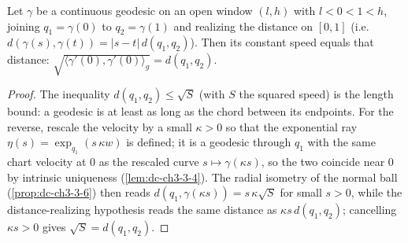 \begin{lemma}
  \label{lem:dc-ch3-4-2-speed-dist}


  Let $\gamma$ be a continuous geodesic on an open window $(l,h)$ with $l<0<1<h$, joining
  $q_1=\gamma(0)$ to $q_2=\gamma(1)$ and realizing the distance on $[0,1]$
  (i.e. $d(\gamma(s),\gamma(t))=|s-t|\,d(q_1,q_2)$). Then its constant speed equals that distance:
  $\sqrt{\langle\gamma'(0),\gamma'(0)\rangle_g}=d(q_1,q_2)$.
\end{lemma}
\begin{proof}
  \sketch

  The inequality $d(q_1,q_2)\le\sqrt{S}$ (with $S$ the squared speed) is the length bound: a geodesic
  is at least as long as the chord between its endpoints. For the reverse, rescale the velocity by a
  small $\kappa>0$ so that the exponential ray $\eta(s)=\exp_{q_1}(s\,\kappa w)$ is defined; it is a
  geodesic through $q_1$ with the same chart velocity at $0$ as the rescaled curve
  $s\mapsto\gamma(\kappa s)$, so the two coincide near $0$ by intrinsic uniqueness
  (\cref{lem:dc-ch3-3-4}). The radial isometry of the normal ball (\cref{prop:dc-ch3-3-6}) then reads
  $d(q_1,\gamma(\kappa s))=s\,\kappa\sqrt{S}$ for small $s>0$, while the distance-realizing hypothesis
  reads the same distance as $\kappa s\,d(q_1,q_2)$; cancelling $\kappa s>0$ gives
  $\sqrt{S}=d(q_1,q_2)$.
\end{proof}

